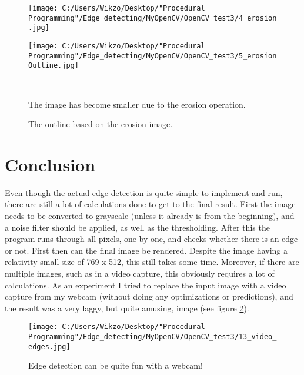 \begin{figure}[H]\centering
	\begin{minipage}[b]{0.48\textwidth}\centering
		\texttt{[image: C:/Users/Wikzo/Desktop/"Procedural Programming"/Edge\_detecting/MyOpenCV/OpenCV\_test3/4\_erosion.jpg]} %
	\end{minipage}\hfill
	\begin{minipage}[b]{0.48\textwidth}\centering
		\texttt{[image: C:/Users/Wikzo/Desktop/"Procedural Programming"/Edge\_detecting/MyOpenCV/OpenCV\_test3/5\_erosionOutline.jpg]} %
	\end{minipage}\\ %
	\begin{minipage}[t]{0.48\textwidth}
		\caption{The image has become smaller due to the erosion operation.} %
		\label{erosion}
	\end{minipage}\hfill
	\begin{minipage}[t]{0.48\textwidth}
		\caption{The outline based on the erosion image.} %
		\label{erosionOutline}
	\end{minipage}
\end{figure}

\section{Conclusion}
Even though the actual edge detection is quite simple to implement and run, there are still a lot of calculations done to get to the final result. First the image needs to be converted to grayscale (unless it already is from the beginning), and a noise filter should be applied, as well as the thresholding. After this the program runs through all pixels, one by one, and checks whether there is an edge or not. First then can the final image be rendered. Despite the image having a relativity small size of 769 x 512, this still takes some time. Moreover, if there are multiple images, such as in a video capture, this obviously requires a lot of calculations. As an experiment I tried to replace the input image with a video capture from my webcam (without doing any optimizations or predictions), and the result was a very laggy, but quite amusing, image (see figure \ref{video_edge}).

\begin{figure} [htbp]
\texttt{[image: C:/Users/Wikzo/Desktop/"Procedural Programming"/Edge\_detecting/MyOpenCV/OpenCV\_test3/13\_video\_edges.jpg]}
\centering
\caption{Edge detection can be quite fun with a webcam!}
\label{video_edge}
\end{figure}

%